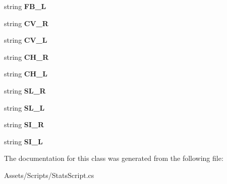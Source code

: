 \begin{DoxyCompactItemize}
\item 
string {\bfseries F\+B\+\_\+L}\hypertarget{class_stats_script_1_1_row_a5e71f621ffba5d30eb3a4b7663d7431f}{}\label{class_stats_script_1_1_row_a5e71f621ffba5d30eb3a4b7663d7431f}

\item 
string {\bfseries C\+V\+\_\+R}\hypertarget{class_stats_script_1_1_row_ae3b7bf7471c084929ac2a806a6fa9ea3}{}\label{class_stats_script_1_1_row_ae3b7bf7471c084929ac2a806a6fa9ea3}

\item 
string {\bfseries C\+V\+\_\+L}\hypertarget{class_stats_script_1_1_row_a9fafc30b39757da4500555e6b06bd61a}{}\label{class_stats_script_1_1_row_a9fafc30b39757da4500555e6b06bd61a}

\item 
string {\bfseries C\+H\+\_\+R}\hypertarget{class_stats_script_1_1_row_aaf0d2c997e3115edc52ec1427f37de85}{}\label{class_stats_script_1_1_row_aaf0d2c997e3115edc52ec1427f37de85}

\item 
string {\bfseries C\+H\+\_\+L}\hypertarget{class_stats_script_1_1_row_a94c000c39f4d477d7e812dcfd00cad46}{}\label{class_stats_script_1_1_row_a94c000c39f4d477d7e812dcfd00cad46}

\item 
string {\bfseries S\+L\+\_\+R}\hypertarget{class_stats_script_1_1_row_ab4a9959606aa795f9c220dee4fb1196d}{}\label{class_stats_script_1_1_row_ab4a9959606aa795f9c220dee4fb1196d}

\item 
string {\bfseries S\+L\+\_\+L}\hypertarget{class_stats_script_1_1_row_aa7e84d0fc858ab30e9da5edf2a7e8ffb}{}\label{class_stats_script_1_1_row_aa7e84d0fc858ab30e9da5edf2a7e8ffb}

\item 
string {\bfseries S\+I\+\_\+R}\hypertarget{class_stats_script_1_1_row_a0ae755bf94568fb2ae506ca717cd70d9}{}\label{class_stats_script_1_1_row_a0ae755bf94568fb2ae506ca717cd70d9}

\item 
string {\bfseries S\+I\+\_\+L}\hypertarget{class_stats_script_1_1_row_a0f231efd84c396fcd8f569911fde55ab}{}\label{class_stats_script_1_1_row_a0f231efd84c396fcd8f569911fde55ab}

\end{DoxyCompactItemize}


The documentation for this class was generated from the following file\+:\begin{DoxyCompactItemize}
\item 
Assets/\+Scripts/Stats\+Script.\+cs\end{DoxyCompactItemize}
